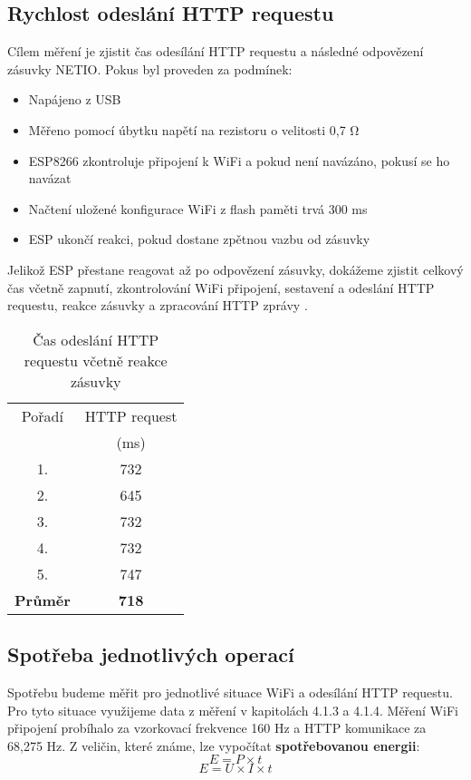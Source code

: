 \documentclass[a4paper, 12pt]{report}
\begin{document}
			\subsection{Rychlost odeslání HTTP requestu}
				Cílem měření je zjistit čas odesílání HTTP requestu a následné odpovězení zásuvky NETIO. Pokus byl proveden za podmínek:
				\begin{itemize}
					\item Napájeno z USB
					\item Měřeno pomocí úbytku napětí na rezistoru o velitosti 0,7 \si{\ohm}
					\item ESP8266 zkontroluje připojení k WiFi a pokud není navázáno, pokusí se ho navázat
					\item Načtení uložené konfigurace WiFi z flash paměti trvá 300 \si{ms}
					\item ESP ukončí reakci, pokud dostane zpětnou vazbu od zásuvky
				\end{itemize}
				Jelikož ESP přestane reagovat až po odpovězení zásuvky, dokážeme zjistit celkový čas včetně zapnutí, zkontrolování WiFi připojení, sestavení a odeslání HTTP requestu, reakce zásuvky a zpracování HTTP zprávy
				.
				\begin{table}[]
					\centering
					\caption{Čas odeslání HTTP requestu včetně reakce zásuvky}
					\begin{tabular}{||c|c||}
						\hline
						Pořadí & HTTP request\\
						& (ms)\\
						\hline
						\hline
						1. & 732\\
						2. & 645\\
						3. & 732\\
						4. & 732\\
						5. & 747\\
						\hline
						{\bf Průměr} & {\bf 718}\\
						\hline
					\end{tabular}
					\label{HTTP odesílání}
				\end{table}

			\subsection{Spotřeba jednotlivých operací}
				Spotřebu budeme měřit pro jednotlivé situace WiFi a odesílání HTTP requestu. Pro tyto situace využijeme data z měření v kapitolách 4.1.3 a 4.1.4. Měření WiFi připojení probíhalo za vzorkovací frekvence 160 Hz a HTTP komunikace za 68,275 Hz. Z veličin, které známe, lze vypočítat \textbf{spotřebovanou energii}:
				$$E = P \times t$$
				$$E = U \times I \times t$$
\end{document}
